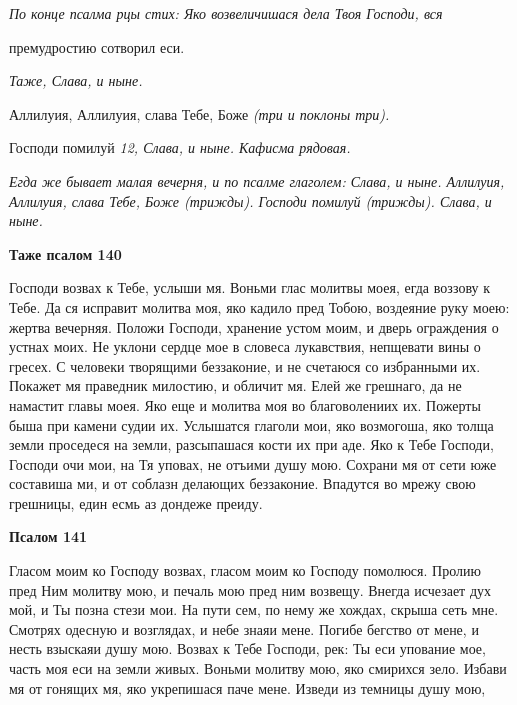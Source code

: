  \itshape По конце псалма рцы стих:\normalfont{} Яко возвеличишася дела Твоя Господи, вся

премудростию сотворил еси.


 \itshape Таже,\normalfont{} \itshape Слава, и ныне\normalfont{}.


   Аллилуия, Аллилуия, слава Тебе, Боже \itshape (три и поклоны три)\normalfont{}.


   Господи помилуй \itshape 12\normalfont{}, \itshape Слава, и ныне\normalfont{}. \itshape Кафисма рядовая.\normalfont{}


 \itshape Егда же бывает малая вечерня, и по псалме глаголем:\normalfont{} \itshape Слава, и ныне\normalfont{}.
Аллилуия, Аллилуия, слава Тебе, Боже \itshape (трижды)\normalfont{}. Господи помилуй
\itshape (трижды)\normalfont{}. \itshape Слава, и ныне\normalfont{}.






 

\bfseries Таже псалом 140\normalfont{}


   Господи возвах к Тебе, услыши мя. Воньми глас молитвы моея, егда
воззову к Тебе. Да ся исправит молитва моя, яко кадило пред Тобою,
воздеяние руку моею: жертва вечерняя. Положи Господи, хранение устом
моим, и дверь ограждения о устнах моих. Не уклони сердце мое в
словеса лукавствия, непщевати вины о гресех. С человеки творящими
беззаконие, и не счетаюся со избранными их. Покажет мя праведник
милостию, и обличит мя. Елей же грешнаго, да не намастит главы
моея. Яко еще и молитва моя во благоволениих их. Пожерты быша
при камени судии их. Услышатся глаголи мои, яко возмогоша, яко
толща земли проседеся на земли, разсыпашася кости их при аде. Яко
к Тебе Господи, Господи очи мои, на Тя уповах, не отъими душу
мою. Сохрани мя от сети юже составиша ми, и от соблазн делающих
беззаконие. Впадутся во мрежу свою грешницы, един есмь аз дондеже
преиду.






 

\bfseries Псалом 141\normalfont{}


   Гласом моим ко Господу возвах, гласом моим ко Господу помолюся.
Пролию пред Ним молитву мою, и печаль мою пред ним возвещу.
Внегда исчезает дух мой, и Ты позна стези мои. На пути сем, по нему
же хождах, скрыша сеть мне. Смотрях одесную и возглядах, и небе
знаяи мене. Погибе бегство от мене, и несть взыскаяи душу мою.
Возвах к Тебе Господи, рек: Ты еси упование мое, часть моя еси на
земли живых. Воньми молитву мою, яко смирихся зело. Избави мя от
гонящих мя, яко укрепишася паче мене. Изведи из темницы душу мою,

